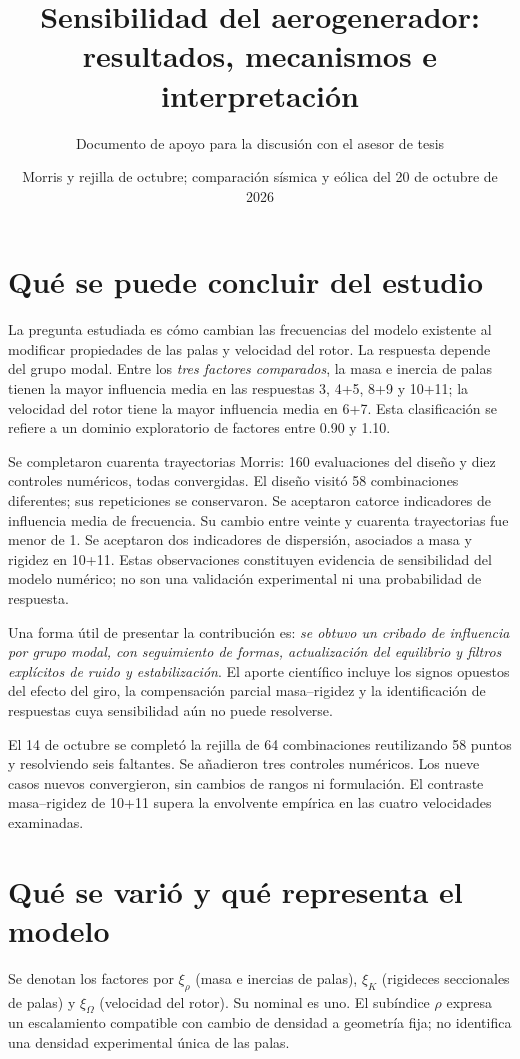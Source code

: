 \documentclass[11pt,a4paper]{article}
\title{Sensibilidad del aerogenerador:\\ resultados, mecanismos e interpretación}
\author{Documento de apoyo para la discusión con el asesor de tesis}
\date{Morris y rejilla de octubre; comparación sísmica y eólica del 20 de octubre de 2026}
\newcommand{\pct}{\text{\char37}}
\begin{document}
\maketitle

\section{Qué se puede concluir del estudio}
La pregunta estudiada es cómo cambian las frecuencias del modelo existente al modificar propiedades de las palas y velocidad del rotor. La respuesta depende del grupo modal. Entre los \emph{tres factores comparados}, la masa e inercia de palas tienen la mayor influencia media en las respuestas 3, 4+5, 8+9 y 10+11; la velocidad del rotor tiene la mayor influencia media en 6+7. Esta clasificación se refiere a un dominio exploratorio de factores entre 0.90 y 1.10.

Se completaron cuarenta trayectorias Morris: 160 evaluaciones del diseño y diez controles numéricos, todas convergidas. El diseño visitó 58 combinaciones diferentes; sus repeticiones se conservaron. Se aceptaron catorce indicadores de influencia media de frecuencia. Su cambio entre veinte y cuarenta trayectorias fue menor de 1\pct. Se aceptaron dos indicadores de dispersión, asociados a masa y rigidez en 10+11. Estas observaciones constituyen evidencia de sensibilidad del modelo numérico; no son una validación experimental ni una probabilidad de respuesta.

Una forma útil de presentar la contribución es: \emph{se obtuvo un cribado de influencia por grupo modal, con seguimiento de formas, actualización del equilibrio y filtros explícitos de ruido y estabilización}. El aporte científico incluye los signos opuestos del efecto del giro, la compensación parcial masa--rigidez y la identificación de respuestas cuya sensibilidad aún no puede resolverse.


El 14 de octubre se completó la rejilla de 64 combinaciones reutilizando 58 puntos y resolviendo seis faltantes. Se añadieron tres controles numéricos. Los nueve casos nuevos convergieron, sin cambios de rangos ni formulación. El contraste masa--rigidez de 10+11 supera la envolvente empírica en las cuatro velocidades examinadas.

\section{Qué se varió y qué representa el modelo}
Se denotan los factores por $\xi_\rho$ (masa e inercias de palas), $\xi_K$ (rigideces seccionales de palas) y $\xi_\Omega$ (velocidad del rotor). Su nominal es uno. El subíndice $\rho$ expresa un escalamiento compatible con cambio de densidad a geometría fija; no identifica una densidad experimental única de las palas.
\end{document}

